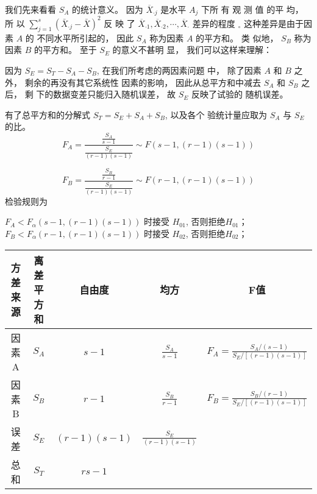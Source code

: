 我们先来看看 $  {S}_{A}  $ 的统计意义。 因为 $  \overline{{X}}_{{\cdot} j}  $ 是水平 $  {A}_{j}  $ 下所
有 观 测 值 的平 均，  所 以 $  \sum_{j=1}^{s}\left(\bar{X}_{\cdot j}-\bar{X}\right)^{2}  $ 反 映 了
$  \overline{{X}}_{{\cdot 1}}, \overline{{X}}_{\cdot 2}, \cdots, \overline{{X}}_{{\cdot}}  $ 差异的程度 $  _{\circ}  $ 这种差异是由于因素 $  {A}  $ 的
不同水平所引起的， 因此 $  S_{A}  $ 称为因素 $  A  $ 的平方和。 类
似地，  $  {S}_{B}  $ 称为因素 $  {B}  $ 的平方和。 至于 $  {S}_{E}  $ 的意义不甚明
显， 我们可以这样来理解：

因为 $  S_{E}=S_{T}-S_{A}-S_{B}  $, 在我们所考虑的两因素问题 中， 除了因素 $  {A}  $ 和 $  {B}  $ 之外， 剩余的再没有其它系统性 因素的影响， 因此从总平方和中减去 $  {S}_{A}  $ 和 $  {S}_{B}  $ 之后， 剩 下的数据变差只能归入随机误差， 故 $  S_{E}  $ 反映了试验的 随机误差。 

有了总平方和的分解式 $  S_{T}=S_{E}+S_{A}+S_{B}  $, 以及各个
验统计量应取为 $  {S}_{A}  $ 与 $  {S}_{E}  $ 的比。 
\begin{equation}
F_{A}=\frac{\frac{S_{A}}{s-1}}{\frac{S_{E}}{(r-1)(s-1)}} \sim F(s-1,(r-1)(s-1))
\end{equation}

\begin{equation}
F_{B}=\frac{\frac{{S}_{B}}{{r}-{1}}}{\frac{{S}_{E}}{({r}-{1})(s-{1})}} \sim {F}({r}-{1},({r}-{1})({s}-{1}))
\end{equation}
检验规则为

$  F_{A}<F_{\alpha}(s-1,(r-1)(s-1))  $ 时接受 $  H_{01}  $, 否则拒绝$  H_{01}  $；
$  F_{B}<F_{\alpha}(r-1,(r-1)(s-1))  $ 时接受 $  H_{02}  $, 否则拒绝$  H_{02}  $；

\begin{table}
   \begin{tabular}{c|c|c|c|c}
    \hline
            方差来源 & 离差平方和 & 自由度 & 均方 & F值 \\
    \hline 因素 A & $  S_{A}  $ & $  s-1  $ & $  \frac{S_{A}}{s-1}  $ & $  F_{A}=\frac{S_{A} /(s-1)}{S_{E} /[(r-1)(s-1)]}  $ \\
    \hline  因素 B & $  S_{B}  $ & $  r-1  $ & $  \frac{S_{B}}{r-1}  $ & $  F_{B}=\frac{S_{B} /(r-1)}{S_{E} /[(r-1)(s-1)]}  $ \\
    \hline 误 差 & $  S_{E}  $ & $  (r-1)(s-1)  $ & $  \frac{S_{E}}{(r-1)(s-1)}  $ & \\
    \hline 总 和 & $  {S}_{T}  $ & $  {r s}-{1}  $ & & \\
    \hline
    \end{tabular} 
\end{table}

